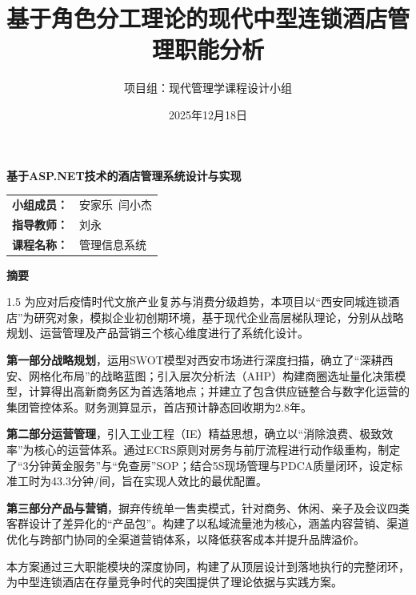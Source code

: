 \documentclass{cumcmthesis}
\title{基于角色分工理论的现代中型连锁酒店管理职能分析}
\author{项目组：现代管理学课程设计小组}
\date{2025年12月18日}
\begin{document}
\begin{titlepage}
    \centering
    \vspace*{4cm}
    

    
    { \heiti \textbf{基于ASP.NET技术的酒店管理系统设计与实现} \par}
    \vspace{6cm}
    
    
    { \songti
    \begin{tabular}{rp{4cm}}
        \textbf{小组成员：} & 安家乐~闫小杰 \\
        \textbf{指导教师：} & 刘永 \\
        \textbf{课程名称：} & 管理信息系统 \\
    \end{tabular}
    }
    \vfill
\end{titlepage}

\newpage
\setcounter{page}{1} 

\begin{center}
     \heiti \textbf{摘\quad 要}
\end{center}

\begin{spacing}{1.5} 
     \songti 
    为应对后疫情时代文旅产业复苏与消费分级趋势，本项目以“西安同城连锁酒店”为研究对象，模拟企业初创期环境，基于现代企业高层梯队理论，分别从战略规划、运营管理及产品营销三个核心维度进行了系统化设计。

    \textbf{第一部分战略规划}，运用SWOT模型对西安市场进行深度扫描，确立了“深耕西安、网格化布局”的战略蓝图；引入层次分析法（AHP）构建商圈选址量化决策模型，计算得出高新商务区为首选落地点；并建立了包含供应链整合与数字化运营的集团管控体系。财务测算显示，首店预计静态回收期为2.8年。

    \textbf{第二部分运营管理}，引入工业工程（IE）精益思想，确立以“消除浪费、极致效率”为核心的运营体系。通过ECRS原则对房务与前厅流程进行动作级重构，制定了“3分钟黄金服务”与“免查房”SOP；结合5S现场管理与PDCA质量闭环，设定标准工时为43.3分钟/间，旨在实现人效比的最优配置。

    \textbf{第三部分产品与营销}，摒弃传统单一售卖模式，针对商务、休闲、亲子及会议四类客群设计了差异化的“产品包”。构建了以私域流量池为核心，涵盖内容营销、渠道优化与跨部门协同的全渠道营销体系，以降低获客成本并提升品牌溢价。

    本方案通过三大职能模块的深度协同，构建了从顶层设计到落地执行的完整闭环，为中型连锁酒店在存量竞争时代的突围提供了理论依据与实践方案。
\end{spacing}
\end{document}
